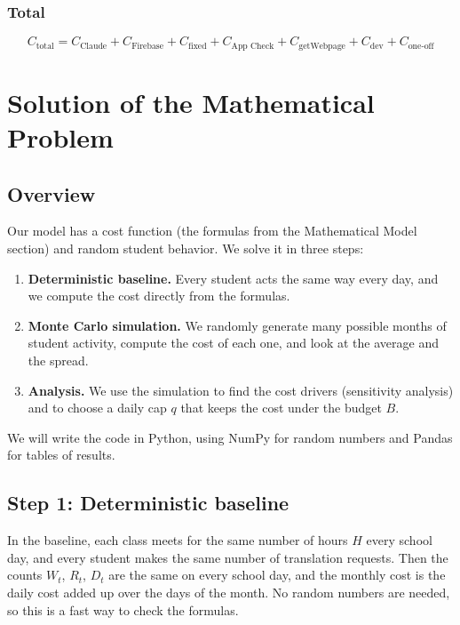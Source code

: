 \documentclass{article}
\begin{document}
\subsubsection{Total}

\[
C_{\text{total}} =
C_{\text{Claude}} + C_{\text{Firebase}} + C_{\text{fixed}}
+ C_{\text{App Check}} + C_{\text{getWebpage}} + C_{\text{dev}}
+ C_{\text{one-off}}
\]


\section{Solution of the Mathematical Problem}

\subsection{Overview}

Our model has a cost function (the formulas from the Mathematical Model section) and random student behavior. We solve it in three steps:

\begin{enumerate}
    \item \textbf{Deterministic baseline.} Every student acts the same way every day, and we compute the cost directly from the formulas.
    \item \textbf{Monte Carlo simulation.} We randomly generate many possible months of student activity, compute the cost of each one, and look at the average and the spread.
    \item \textbf{Analysis.} We use the simulation to find the cost drivers (sensitivity analysis) and to choose a daily cap $q$ that keeps the cost under the budget $B$.
\end{enumerate}

We will write the code in Python, using NumPy for random numbers and Pandas for tables of results.

\subsection{Step 1: Deterministic baseline}

In the baseline, each class meets for the same number of hours $H$ every school day, and every student makes the same number of translation requests. Then the counts $W_t$, $R_t$, $D_t$ are the same on every school day, and the monthly cost is the daily cost added up over the days of the month. No random numbers are needed, so this is a fast way to check the formulas.
\end{document}
